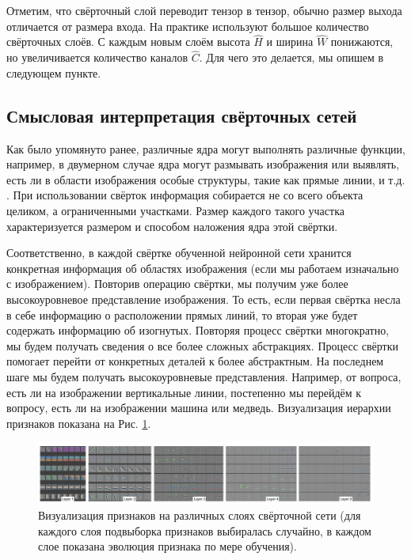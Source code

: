 \documentclass[12pt, fleqn]{article}
\begin{document}
    Отметим, что свёрточный слой переводит тензор в тензор, обычно размер выхода отличается от размера входа. 
    На практике используют большое количество свёрточных слоёв. С каждым новым
    слоём высота $\hat{H}$ и ширина $\hat{W}$ понижаются, но увеличивается количество каналов $\hat{C}$.
    Для чего это делается, мы опишем в следующем пункте.
        
    \subsection{Смысловая интерпретация свёрточных сетей} \label{cnn_vis}

    Как было упомянуто ранее, различные ядра могут выполнять различные функции,
    например, в двумерном случае ядра могут размывать изображения или выявлять,
    есть ли в области изображения особые структуры, такие как прямые линии, и т.д. . При
    использовании свёрток информация собирается не со всего объекта целиком, а ограниченными 
    участками. Размер каждого такого участка характеризуется размером и
    способом наложения ядра этой свёртки. 
    
    Соответственно, в каждой свёртке обученной нейронной сети 
    хранится конкретная информация об областях изображения (если мы работаем изначально с изображением).
    Повторив операцию свёртки, мы получим уже более высокоуровневое представление
    изображения. То есть, если первая свёртка несла в себе информацию о расположении
    прямых линий, то вторая уже будет содержать информацию об изогнутых.
    Повторяя процесс свёртки многократно, мы будем получать сведения о все
    более сложных абстракциях. Процесс свёртки помогает перейти от конкретных
    деталей к более абстрактным. На последнем шаге мы будем получать высокоуровневые
    представления. Например, от вопроса, есть ли на изображении вертикальные линии, постепенно 
    мы перейдём к вопросу, есть ли на изображении машина или медведь. Визуализация
    иерархии признаков показана на Рис. \ref{conv_vis}.

    \begin{figure}[ht]
        \centering
        \includegraphics[scale=0.43]{pics/conv_vis.png}
        \caption{Визуализация признаков на различных слоях свёрточной сети (для каждого слоя подвыборка признаков выбиралась случайно, в каждом слое показана эволюция признака по мере обучения)\cite{zeiler2014visualizing}.}
        \label{conv_vis}
    \end{figure}
        
\end{document}
